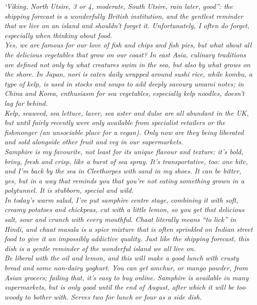 \documentclass{book}
\begin{document}
\emph{‘Viking, North Utsire, 3 or 4, moderate, South Utsire, rain later, good”: the shipping forecast is a wonderfully British institution, and the gentlest reminder that we live on an island and shouldn’t forget it. Unfortunately, I often do forget, especially when thinking about food.\\ 
Yes, we are famous for our love of fish and chips and fish pies, but what about all the delicious vegetables that grow on our coast? In east Asia, culinary traditions are defined not only by what creatures swim in the sea, but also by what grows on the shore. In Japan, nori is eaten daily wrapped around sushi rice, while kombu, a type of kelp, is used in stocks and soups to add deeply savoury umami notes; in China and Korea, enthusiasm for sea vegetables, especially kelp noodles, doesn’t lag far behind.\\ 
Kelp, seaweed, sea lettuce, laver, sea aster and dulse are all abundant in the UK, but until fairly recently were only available from specialist retailers or the fishmonger (an unsociable place for a vegan). Only now are they being liberated and sold alongside other fruit and veg in our supermarkets.\\ 
Samphire is my favourite, not least for its unique flavour and texture: it’s bold, briny, fresh and crisp, like a burst of sea spray. It’s transportative, too: one bite, and I’m back by the sea in Cleethorpes with sand in my shoes. It can be bitter, yes, but in a way that reminds you that you’re not eating something grown in a polytunnel. It is stubborn, special and wild.\\ 
In today’s warm salad, I’ve put samphire centre stage, combining it with soft, creamy potatoes and chickpeas, cut with a little lemon, so you get that delicious salt, sour and crunch with every mouthful. Chaat literally means “to lick” in Hindi, and chaat masala is a spice mixture that is often sprinkled on Indian street food to give it an impossibly addictive quality. Just like the shipping forecast, this dish is a gentle reminder of the wonderful island we all live on.\\ 
Be liberal with the oil and lemon, and this will make a good lunch with crusty bread and some non-dairy yoghurt. You can get amchur, or mango powder, from Asian grocers; failing that, it’s easy to buy online. Samphire is available in many supermarkets, but is only good until the end of August, after which it will be too woody to bother with. Serves two for lunch or four as a side dish.}\\\\ 
\end{document}
